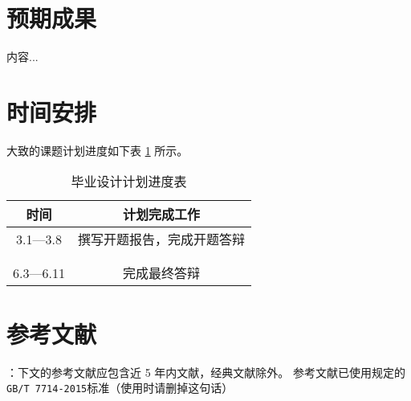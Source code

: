 \documentclass[UTF8,AutoFakeBold,AutoFakeSlant,zihao=-4]{ctexart}
\begin{document}
\newpage
\section{预期成果}
\begin{ubox}
	内容...
\end{ubox}

\newpage
\section{时间安排}
\begin{ubox}
大致的课题计划进度如下表 \ref{tab:progress} 所示。

\renewcommand*\arraystretch{1.5} 
\begin{table}[H]
  \centering
  \caption{毕业设计计划进度表}
  \label{tab:progress}
  \begin{tabular}{@{}cc@{}}
    \toprule
    时间 & 计划完成工作       \\ \midrule
    3.1—3.8 & 撰写开题报告，完成开题答辩 \\\hline
    & \\\hline
    & \\\hline
    6.3—6.11 & 完成最终答辩\\\bottomrule
  \end{tabular}

\end{table}

\end{ubox}

\newpage
\section{参考文献}
\begin{ubox}
：下文的参考文献应包含近 5 年内文献，经典文献除外。 参考文献已使用规定的\texttt{GB/T 7714-2015}标准（使用时请删掉这句话）
\printbibliography[heading=none]
\end{ubox}
\end{document}
